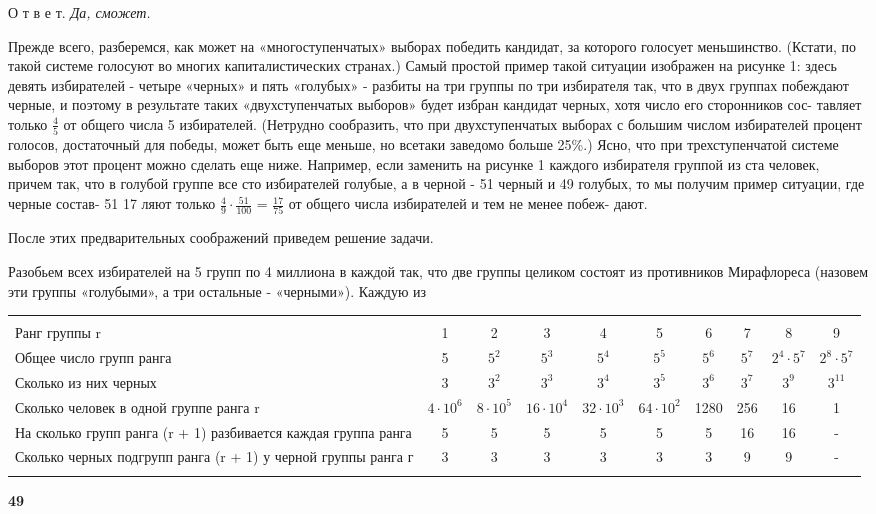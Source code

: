\begin{multicols}{2}
    \par
    О т в е т. \emph{Да, сможет.}
    \par 
    Прежде всего, разберемся, как может на «многоступенчатых» выборах
    победить кандидат, за которого голосует меньшинство. (Кстати, по такой системе голосуют во многих капиталистических странах.) Самый простой пример такой ситуации изображен на рисунке 1: здесь девять избирателей - четыре «черных» и пять «голубых» - разбиты на три группы по три избирателя так, что в двух группах побеждают черные, и поэтому в результате таких «двухступенчатых выборов» будет избран кандидат черных, хотя число его сторонников сос-
    тавляет только \Large{$\frac{4}{5}$} от общего числа 5
    избирателей. (Нетрудно сообразить, что при двухступенчатых выборах с большим числом избирателей процент голосов, достаточный для победы, может быть еще меньше, но всетаки заведомо больше 25\%.) Ясно, что при трехступенчатой системе выборов этот процент можно сделать еще ниже. Например, если заменить на рисунке 1 каждого избирателя группой из ста человек, причем так, что в голубой группе все сто избирателей голубые, а в черной - 51 черный и 49 голубых, то мы получим пример ситуации, где черные состав- 51 17 ляют только \Large{$\frac{4}{9} \cdot \frac{51}{100}$ = $\frac{17}{75}$}  от общего числа избирателей и тем не менее побеж-
    дают.
    \par
    После этих предварительных соображений приведем решение задачи. 
    \par
    Разобьем всех избирателей на 5 групп по 4 миллиона в каждой так, что две группы целиком состоят из противников Мирафлореса (назовем эти группы «голубыми», а три остальные - «черными»). Каждую из
\end{multicols}



\hspace{-15px}\begin{tabular}{p{6cm} C C C C C C C C C}
    \hline
    &&&&&&&&&\\
    Ранг группы r & 1 & 2 & 3 & 4 & 5 & 6 & 7 & 8 & 9\\
    Общее число групп ранга & 5 & $5^2$ & $5^3$ & $5^4$ & $5^5$ & $5^6$ & $5^7$ & $2^4 \cdot 5^7$ & $2^8 \cdot 5^7$\\
    Сколько из них черных & 3 & $3^2$ & $3^3$ & $3^4$ & $3^5$ & $3^6$ & $3^7$ & $3^9$ & $3^11$\\
    Сколько человек в одной группе ранга r & $4 \cdot 10^6$ & $8 \cdot 10^5$ & $16 \cdot 10^4$ & $32 \cdot 10^3$ & $64 \cdot 10^2$ & 1280 &256 & 16 & 1\\
    На сколько групп ранга (r + 1) разбивается каждая группа ранга & 5 & 5 & 5 & 5 & 5 & 5 & 16 & 16 & - \\
    Сколько черных подгрупп ранга (r + 1) у черной группы ранга г & 3 & 3 & 3 & 3 & 3 & 3 & 9 & 9 & - \\
    &&&&&&&&&\\
    \hline
    
\end{tabular}
\begin{flushright}
    \textbf{49}
\end{flushright}

